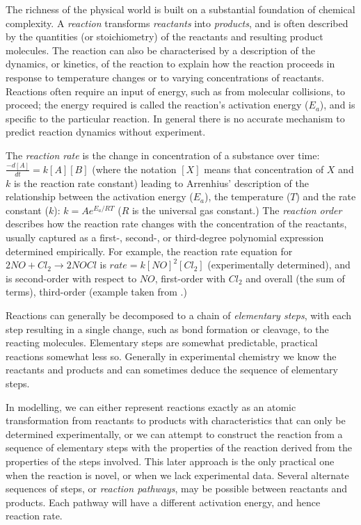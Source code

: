 The richness of the physical world is built on a substantial foundation of chemical complexity. A \textit{reaction} transforms \emph{reactants} into \emph{products}, and is often described by the quantities (or stoichiometry) of the reactants and resulting product molecules. The reaction can also be characterised by a description of the dynamics, or kinetics, of the reaction to explain how the reaction proceeds in response to temperature changes or to varying concentrations of reactants. Reactions often require an input of energy, such as from molecular collisions, to proceed; the energy required is called the reaction's activation energy (\(E_a\)), and is specific to the particular reaction. In general there is no accurate mechanism to predict reaction dynamics without experiment.

The \textit{reaction rate} is the change in concentration of a substance over time: \(\frac{-d[A]}{dt} = k[A][B]\) (where the notation \([X]\) means that concentration of \(X\) and \(k\) is the reaction rate constant) leading to Arrenhius' description of the relationship between the activation energy (\(E_a\)), the temperature (\(T\)) and the rate constant (\(k\)): \(k = Ae^{E_a/RT}\) ($R$ is the universal gas constant.) The \textit{reaction order} describes how the reaction rate changes with the concentration of the reactants, usually captured as a first-, second-, or third-degree polynomial expression determined empirically. For example, the reaction rate equation for \(2NO + Cl_2 \rightarrow 2NOCl\) is \(rate = k[NO]^2[Cl_2]\) (experimentally determined), and is second-order with respect to \(NO\), first-order with \(Cl_2\) and overall (the sum of terms), third-order (example taken from \textcite{Kotz2006}.)

Reactions can generally be decomposed to a chain of \emph{elementary steps}, with each step resulting in a single change, such as bond formation or cleavage, to the reacting molecules. Elementary steps are somewhat predictable, practical reactions somewhat less so. Generally in experimental chemistry we know the reactants and products and can sometimes deduce the sequence of elementary steps.

In modelling, we can either represent reactions exactly as an atomic transformation from reactants to products with characteristics that can only be determined experimentally, or we can attempt to construct the reaction from a sequence of elementary steps with the properties of the reaction derived from the properties of the steps involved. This later approach is the only practical one when the reaction is novel, or when we lack experimental data. Several alternate sequences of steps, or \textit{reaction pathways}, may be possible between reactants and products. Each pathway will have a different activation energy, and hence reaction rate.

